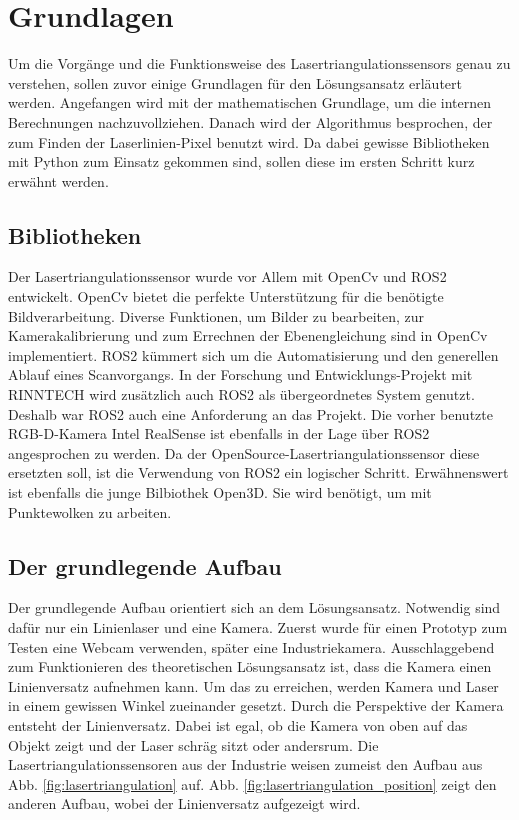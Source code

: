 \section{Grundlagen}\label{grundlagen}
	Um die Vorgänge und die Funktionsweise des Lasertriangulationssensors genau zu verstehen, sollen zuvor einige Grundlagen für den Lösungsansatz erläutert werden. Angefangen wird mit der mathematischen Grundlage, um die internen Berechnungen nachzuvollziehen. Danach wird der Algorithmus besprochen, der zum Finden der Laserlinien-Pixel benutzt wird. Da dabei gewisse Bibliotheken mit Python zum Einsatz gekommen sind, sollen diese im ersten Schritt kurz erwähnt werden.
	
	\subsection{Bibliotheken}
	Der Lasertriangulationssensor wurde vor Allem mit OpenCv und ROS2 entwickelt. OpenCv bietet die perfekte Unterstützung für die benötigte Bildverarbeitung. Diverse Funktionen, um Bilder zu bearbeiten, zur Kamerakalibrierung und zum Errechnen der Ebenengleichung sind in OpenCv implementiert. \newline
	ROS2 kümmert sich um die Automatisierung und den generellen Ablauf eines Scanvorgangs. In der Forschung und Entwicklungs-Projekt mit RINNTECH wird zusätzlich auch ROS2 als übergeordnetes System genutzt. Deshalb war ROS2 auch eine Anforderung an das Projekt. Die vorher benutzte RGB-D-Kamera Intel RealSense ist ebenfalls in der Lage über ROS2 angesprochen zu werden. Da der OpenSource-Lasertriangulationssensor diese ersetzten soll, ist die Verwendung von ROS2 ein logischer Schritt. \newline
	Erwähnenswert  ist ebenfalls die junge Bilbiothek Open3D. Sie wird benötigt, um mit Punktewolken zu arbeiten.
	
	\subsection{Der grundlegende Aufbau}
	Der grundlegende Aufbau orientiert sich an dem Lösungsansatz. Notwendig sind dafür nur ein Linienlaser und eine Kamera. Zuerst wurde für einen Prototyp zum Testen eine Webcam verwenden, später eine Industriekamera. Ausschlaggebend zum Funktionieren des theoretischen Lösungsansatz ist, dass die Kamera einen Linienversatz aufnehmen kann. Um das zu erreichen, werden Kamera und Laser in einem gewissen Winkel zueinander gesetzt. Durch die Perspektive der Kamera entsteht der Linienversatz. Dabei ist egal, ob die Kamera von oben auf das Objekt zeigt und der Laser schräg sitzt oder andersrum. Die Lasertriangulationssensoren aus der Industrie weisen zumeist den Aufbau aus Abb. \ref{fig:lasertriangulation} auf. Abb. \ref{fig:lasertriangulation_position} zeigt den anderen Aufbau, wobei der Linienversatz aufgezeigt wird.
	
